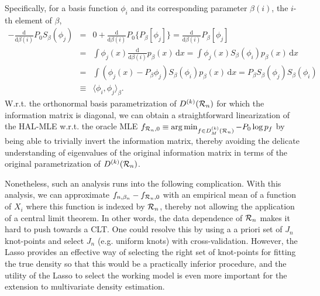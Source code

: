 Specifically, for a basis function $\phi_i$ and its corresponding parameter $\beta(i)$, the $i$-th element of $\beta$,
\begin{eqnarray} \label{eq:inner-product-score}
-\frac{\mathrm{d}}{\mathrm{d}\beta(i)}P_0 S_{\beta}(\phi_j)
&=& 0+ \frac{\mathrm{d}}{\mathrm{d}\beta(i)} P_0 \{P_{\beta}[\phi_j]\} \nonumber = \frac{\mathrm{d}}{\mathrm{d}\beta(i)} P_{\beta}[\phi_j]\\ &=& \int \phi_j(x) \frac{\mathrm{d}}{\mathrm{d}\beta(i)} p_{\beta}(x) \, \mathrm{d}x \nonumber 
= \int \phi_j(x) S_{\beta}(\phi_i) p_{\beta}(x) \, \mathrm{d}x \nonumber \\
&=& \int (\phi_j(x) - P_{\beta} \phi_j) S_{\beta}(\phi_i) p_{\beta}(x) \, \mathrm{d}x \nonumber 
= P_{\beta} S_{\beta}(\phi_j) S_{\beta}(\phi_i) \nonumber \\
&\equiv& \langle \phi_i, \phi_j \rangle_{\beta}.
\end{eqnarray}
W.r.t. the orthonormal basis parametrization of $D^{(k)}({\cal R}_n)$ for which the information matrix is diagonal, we can obtain a straightforward linearization of the HAL-MLE w.r.t. the oracle MLE $f_{{\cal R}_n,0}\equiv \arg\min_{f\in D^{(k)}_M({\cal R}_{n})}-P_0 \log p_f$ by being able to trivially invert the information matrix, thereby avoiding the delicate understanding of eigenvalues of the original information matrix in terms of the original parametrization of $D^{(k)}({\cal R}_n)$.


Nonetheless, such an analysis runs into the following complication. 
With this analysis, we can approximate $f_{n,\beta_n}-f_{{\cal R}_n,0}$ with an empirical mean of a function of $X_i$ where this function is indexed by ${\cal R}_n$, thereby not allowing the application of a central limit theorem. In other words, the data dependence of ${\cal R}_n$ makes it hard to push towards a CLT. One could resolve this by using a a priori set of $J_n$ knot-points and select $J_n$ (e.g. uniform knots) with cross-validation. However, the Lasso provides an effective way of selecting the right set of knot-points for fitting the true density so that this would be a practically inferior procedure, and the utility of the Lasso to select the working model is even more important for the extension to multivariate density estimation. 


